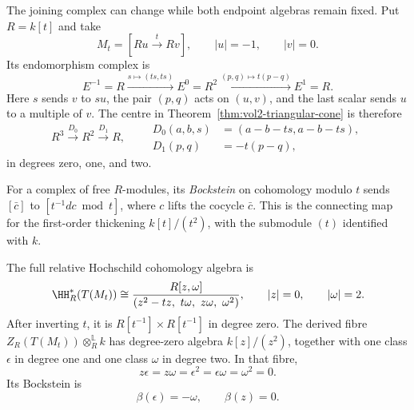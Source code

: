 The joining complex can change while both endpoint algebras
remain fixed. Put $R=k[t]$ and take
\[
 M_t=[Ru\xrightarrow{\ t\ }Rv],
 \qquad |u|=-1,
 \qquad |v|=0.
\]
Its endomorphism complex is
\[
 E^{-1}=R\xrightarrow{s\mapsto(ts,ts)}E^0=R^2
 \xrightarrow{(p,q)\mapsto t(p-q)}E^1=R.
\]
Here $s$ sends $v$ to $su$, the pair $(p,q)$ acts on $(u,v)$,
and the last scalar sends $u$ to a multiple of $v$.
The centre in Theorem~\ref{thm:vol2-triangular-cone} is therefore
\begin{equation}\label{eq:vol2-varying-complex}
 R^3\xrightarrow{D_0}R^2\xrightarrow{D_1}R,
 \qquad
 \begin{aligned}
 D_0(a,b,s)&=(a-b-ts,a-b-ts),\\
 D_1(p,q)&=-t(p-q),
 \end{aligned}
\end{equation}
in degrees zero, one, and two.

For a complex of free $R$-modules, its \emph{Bockstein}
on cohomology modulo $t$ sends $[\bar c]$ to
$[t^{-1}dc\bmod t]$, where $c$ lifts the cocycle $\bar c$.
This is the connecting map for the first-order thickening
$k[t]/(t^2)$, with the submodule $(t)$ identified with $k$.

\begin{theorem}\label{thm:vol2-varying-centre}
The full relative Hochschild cohomology algebra is
\begin{equation}\label{eq:vol2-varying-ring}
 \HH_R^*(T(M_t))
 \cong\frac{R[z,\omega]}
 {(z^2-tz,\ t\omega,\ z\omega,\ \omega^2)},
 \qquad |z|=0,
 \qquad |\omega|=2.
\end{equation}
After inverting $t$, it is $R[t^{-1}]\times R[t^{-1}]$ in
degree zero. The derived fibre
$Z_R(T(M_t))\otimes_R^{\mathbb L}k$ has degree-zero algebra
$k[z]/(z^2)$, together with one class $\epsilon$ in degree one
and one class $\omega$ in degree two. In that fibre,
\[
 z\epsilon=z\omega=\epsilon^2=\epsilon\omega=\omega^2=0.
\]
Its Bockstein is
\begin{equation}\label{eq:vol2-centre-bockstein}
 \beta(\epsilon)=-\omega,
 \qquad \beta(z)=0.
\end{equation}
\end{theorem}

